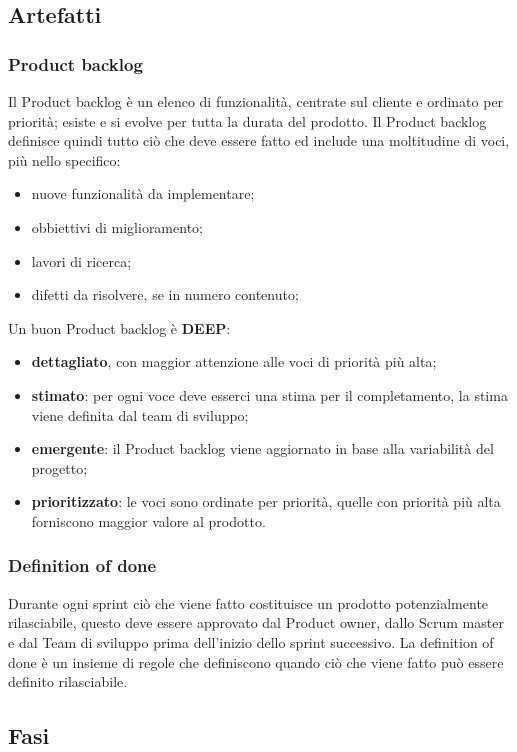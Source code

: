 \subsection{Artefatti}

\subsubsection{Product backlog}
Il Product backlog è un elenco di funzionalità, centrate sul cliente e ordinato per priorità; esiste e si evolve per tutta la durata del prodotto. Il Product backlog definisce quindi tutto ciò che deve essere fatto ed include una moltitudine di voci, più nello specifico:
\begin{itemize}
    \item nuove funzionalità da implementare;
    \item obbiettivi di miglioramento;
    \item lavori di ricerca;
    \item difetti da risolvere, se in numero contenuto;
\end{itemize}
Un buon Product backlog è \textbf{DEEP}:
\begin{itemize}
    \item \textbf{dettagliato}, con maggior attenzione alle voci di priorità più alta;
    \item \textbf{stimato}: per ogni voce deve esserci una stima per il completamento, la stima viene definita dal team di sviluppo;
    \item \textbf{emergente}: il Product backlog viene aggiornato in base alla variabilità del progetto;
    \item \textbf{prioritizzato}: le voci sono ordinate per priorità, quelle con priorità più alta forniscono maggior valore al prodotto.
\end{itemize}

\subsubsection{Definition of done}
Durante ogni sprint ciò che viene fatto costituisce un prodotto potenzialmente rilasciabile, questo deve essere approvato dal Product owner, dallo Scrum master e dal Team di sviluppo prima dell'inizio dello sprint successivo. La definition of done è un insieme di regole che definiscono quando ciò che viene fatto può essere definito rilasciabile.


\subsection{Fasi}

